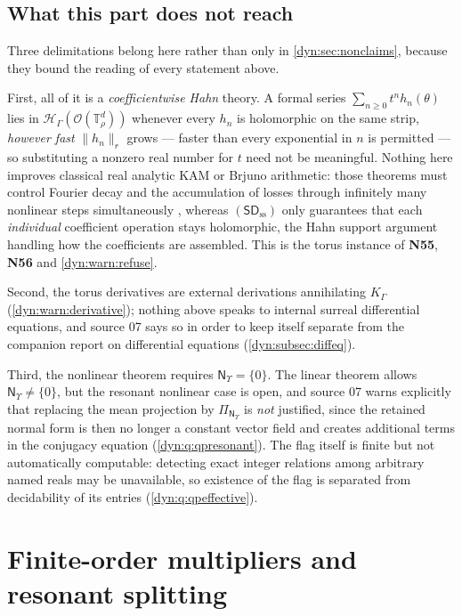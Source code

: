 \documentclass[11pt,letterpaper]{article}
\theoremstyle{definition}
\theoremstyle{remark}
\newcommand{\HH}{\mathscr H}
\newcommand{\OO}{\mathcal O}
\newcommand{\sdss}{\mathsf{SD}_{\mathrm{ss}}}
\newcommand{\TT}{\mathbb T}
\newcommand{\strip}{\OO(\TT^{d}_{\rho})}
\newcommand{\qlat}{\mathsf N_{\Upsilon}}
\numberwithin{equation}{section}
\begin{document}
\subsection{What this part does not reach}
\label{dyn:subsec:qplimits}

Three delimitations belong here rather than only in
\cref{dyn:sec:nonclaims}, because they bound the reading of every statement
above.

First, all of it is a \emph{coefficientwise Hahn} theory. A formal series
$\sum_{n\ge0}t^{n}h_n(\theta)$ lies in $\HH_\Gamma(\strip)$ whenever every
$h_n$ is holomorphic on the same strip, \emph{however fast} $\|h_n\|_{r}$
grows --- faster than every exponential in $n$ is permitted --- so
substituting a nonzero real number for $t$ need not be meaningful. Nothing
here improves classical real analytic KAM or Brjuno arithmetic: those
theorems must control Fourier decay and the accumulation of losses through
infinitely many nonlinear steps simultaneously \cite{Bounemoura,Chevallier},
whereas $(\sdss)$ only guarantees that each \emph{individual} coefficient
operation stays holomorphic, the Hahn support argument handling how the
coefficients are assembled. This is the torus instance of
\textbf{N55}, \textbf{N56} and \cref{dyn:warn:refuse}.

Second, the torus derivatives are external derivations annihilating
$K_\Gamma$ (\cref{dyn:warn:derivative}); nothing above speaks to internal
surreal differential equations, and source 07 says so in order to keep
itself separate from the companion report on differential equations
(\cref{dyn:subsec:diffeq}).

Third, the nonlinear theorem requires $\qlat=\{0\}$. The linear theorem
allows $\qlat\ne\{0\}$, but the resonant nonlinear case is open, and
source 07 warns explicitly that replacing the mean projection by
$\Pi_{\qlat}$ is \emph{not} justified, since the retained normal form is
then no longer a constant vector field and creates additional terms in the
conjugacy equation (\cref{dyn:q:qpresonant}). The flag itself is finite but
not automatically computable: detecting exact integer relations among
arbitrary named reals may be unavailable, so existence of the flag is
separated from decidability of its entries (\cref{dyn:q:qpeffective}).

\section{Finite-order multipliers and resonant splitting}
\label{dyn:sec:resonant-normal}
\end{document}
